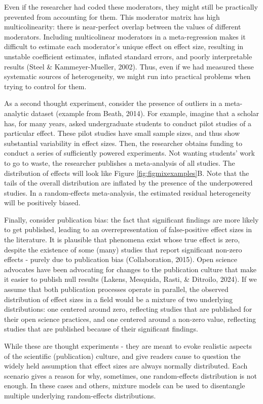 \documentclass[
  english,
  man, noextraspace,floatsintext]{apa6}
\begin{document}
Even if the researcher had coded these moderators, they might still be practically prevented from accounting for them.
This moderator matrix has high multicolinearity: there is near-perfect overlap between the values of different moderators.
Including multicolinear moderators in a meta-regression makes it difficult to estimate each moderator's unique effect on effect size, resulting in unstable coefficient estimates, inflated standard errors, and poorly interpretable results (Steel \& Kammeyer-Mueller, 2002).
Thus, even if we had measured these systematic sources of heterogeneity, we might run into practical problems when trying to control for them.

As a second thought experiment, consider the presence of outliers in a meta-analytic dataset (example from Beath, 2014).
For example, imagine that a scholar has, for many years, asked undergraduate students to conduct pilot studies of a particular effect.
These pilot studies have small sample sizes, and thus show substantial variability in effect sizes.
Then, the researcher obtains funding to conduct a series of sufficiently powered experiments.
Not wanting students' work to go to waste, the researcher publishes a meta-analysis of all studies.
The distribution of effects will look like Figure \ref{fig:figmixexamples}B.
Note that the tails of the overall distribution are inflated by the presence of the underpowered studies.
In a random-effects meta-analysis, the estimated residual heterogeneity will be positively biased.

Finally, consider publication bias: the fact that significant findings are more likely to get published, leading to an overrepresentation of false-positive effect sizes in the literature.
It is plausible that phenomena exist whose true effect is zero, despite the existence of some (many) studies that report significant non-zero effects - purely due to publication bias (Collaboration, 2015).
Open science advocates have been advocating for changes to the publication culture that make it easier to publish null results (Lakens, Mesquida, Rasti, \& Ditroilo, 2024).
If we assume that both publication processes operate in parallel, the observed distribution of effect sizes in a field would be a mixture of two underlying distributions:
one centered around zero, reflecting studies that are published for their open science practices,
and one centered around a non-zero value, reflecting studies that are published because of their significant findings.

While these are thought experiments - they are meant to evoke realistic aspects of the scientific (publication) culture,
and give readers cause to question the widely held assumption that effect sizes are always normally distributed.
Each scenario gives a reason for why, sometimes, one random-effects distribution is not enough.
In these cases and others, mixture models can be used to disentangle multiple underlying random-effects distributions.
\end{document}
